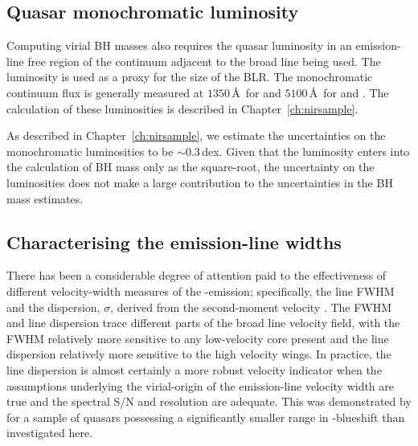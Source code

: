 \subsection{Quasar monochromatic luminosity}

Computing virial BH masses also requires the quasar luminosity in an emission-line free region of the continuum adjacent to the broad line being used.
The luminosity is used as a proxy for the size of the BLR.
The monochromatic continuum flux is generally measured at $1350$\,\AA\ for  and $5100$\,\AA\, for \ha and \hbns.
The calculation of these luminosities is described in Chapter~\ref{ch:nirsample}.

As described in Chapter~\ref{ch:nirsample}, we estimate the uncertainties on the monochromatic luminosities to be $\sim0.3$\,dex.
Given that the luminosity enters into the calculation of BH mass only as the square-root, the uncertainty on the luminosities does not make a large contribution to the uncertainties in the BH mass estimates.

\subsection{Characterising the emission-line widths}
\label{sub:charemprof}

There has been a considerable degree of attention paid to the effectiveness of different velocity-width measures of the -emission; specifically, the line FWHM and the dispersion, $\sigma$, derived from the second-moment velocity \citep[e.g.][]{assef11, denney13}.
The FWHM and line dispersion trace different parts of the broad line velocity field, with the FWHM relatively more sensitive to any low-velocity core present and the line dispersion relatively more sensitive to the high velocity wings.
In practice, the line dispersion is almost certainly a more robust velocity indicator when the assumptions underlying the virial-origin of the emission-line velocity width are true and the spectral S/N and resolution are adequate.
This was demonstrated by \citet{denney13} for a sample of quasars possessing a significantly smaller range in -blueshift than investigated here.

